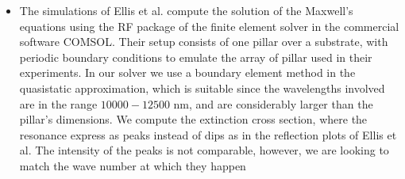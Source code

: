 \begin{itemize}

\item {The simulations of Ellis et al. compute the solution of the Maxwell's equations using the RF package
of the finite element solver in the commercial software COMSOL. Their setup consists of one pillar over a 
substrate, with periodic boundary conditions to emulate the array of pillar used in their experiments. In our 
solver we use a boundary element method in the quasistatic approximation, which is suitable since the wavelengths
involved are in the range $10000-12500$ nm, and are considerably larger than the pillar's dimensions. We compute 
the extinction cross section, where the resonance express as peaks instead of dips as in the reflection plots of 
Ellis et al. The intensity of the peaks is not comparable, however, we are looking to match the wave number at which
they happen}



\end{itemize}
